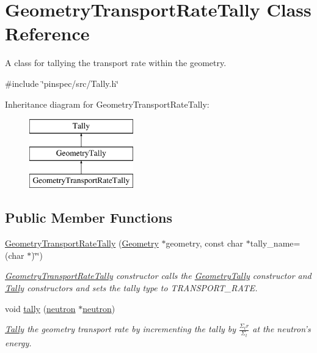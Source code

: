 \hypertarget{classGeometryTransportRateTally}{\section{Geometry\-Transport\-Rate\-Tally Class Reference}
\label{classGeometryTransportRateTally}
}


A class for tallying the transport rate within the geometry.  




{\ttfamily \#include \char`\"{}pinspec/src/\-Tally.\-h\char`\"{}}

Inheritance diagram for Geometry\-Transport\-Rate\-Tally\-:\begin{figure}[H]
\begin{center}
\leavevmode
\includegraphics[height=3.000000cm]{classGeometryTransportRateTally}
\end{center}
\end{figure}
\subsection*{Public Member Functions}
\begin{DoxyCompactItemize}
\item 
\hyperlink{classGeometryTransportRateTally_a04cb0a51c0a30bfb90966ea9f35c687c}{Geometry\-Transport\-Rate\-Tally} (\hyperlink{classGeometry}{Geometry} $\ast$geometry, const char $\ast$tally\-\_\-name=(char $\ast$)\char`\"{}\char`\"{})
\begin{DoxyCompactList}\small\item\em \hyperlink{classGeometryTransportRateTally}{Geometry\-Transport\-Rate\-Tally} constructor calls the \hyperlink{classGeometryTally}{Geometry\-Tally} constructor and \hyperlink{classTally}{Tally} constructors and sets the tally type to T\-R\-A\-N\-S\-P\-O\-R\-T\-\_\-\-R\-A\-T\-E. \end{DoxyCompactList}\item 
void \hyperlink{classGeometryTransportRateTally_ab634a607b837e7e4a8637af0d7ab5d74}{tally} (\hyperlink{structneutron}{neutron} $\ast$\hyperlink{structneutron}{neutron})
\begin{DoxyCompactList}\small\item\em \hyperlink{classTally}{Tally} the geometry transport rate by incrementing the tally by $ \frac{\Sigma_tr}{\Sigma_t} $ at the neutron's energy. \end{DoxyCompactList}\end{DoxyCompactItemize}
